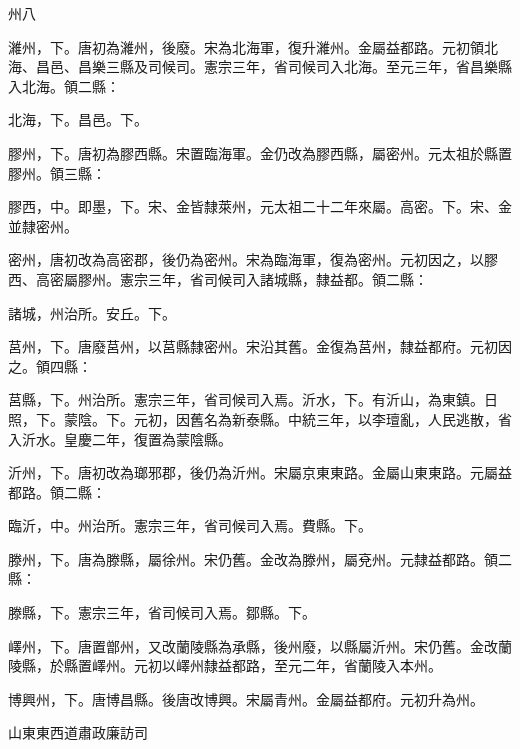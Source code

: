 \begin{pinyinscope}
 州八



 濰州，下。唐初為濰州，後廢。宋為北海軍，復升濰州。金屬益都路。元初領北海、昌邑、昌樂三縣及司候司。憲宗三年，省司候司入北海。至元三年，省昌樂縣入北海。領二縣：



 北海，下。昌邑。下。



 膠州，下。唐初為膠西縣。宋置臨海軍。金仍改為膠西縣，屬密州。元太祖於縣置膠州。領三縣：



 膠西，中。即墨，下。宋、金皆隸萊州，元太祖二十二年來屬。高密。下。宋、金並隸密州。



 密州，唐初改為高密郡，後仍為密州。宋為臨海軍，復為密州。元初因之，以膠西、高密屬膠州。憲宗三年，省司候司入諸城縣，隸益都。領二縣：



 諸城，州治所。安丘。下。



 莒州，下。唐廢莒州，以莒縣隸密州。宋沿其舊。金復為莒州，隸益都府。元初因之。領四縣：



 莒縣，下。州治所。憲宗三年，省司候司入焉。沂水，下。有沂山，為東鎮。日照，下。蒙陰。下。元初，因舊名為新泰縣。中統三年，以李璮亂，人民逃散，省入沂水。皇慶二年，復置為蒙陰縣。



 沂州，下。唐初改為瑯邪郡，後仍為沂州。宋屬京東東路。金屬山東東路。元屬益都路。領二縣：



 臨沂，中。州治所。憲宗三年，省司候司入焉。費縣。下。



 滕州，下。唐為滕縣，屬徐州。宋仍舊。金改為滕州，屬兗州。元隸益都路。領二縣：



 滕縣，下。憲宗三年，省司候司入焉。鄒縣。下。



 嶧州，下。唐置鄫州，又改蘭陵縣為承縣，後州廢，以縣屬沂州。宋仍舊。金改蘭陵縣，於縣置嶧州。元初以嶧州隸益都路，至元二年，省蘭陵入本州。



 博興州，下。唐博昌縣。後唐改博興。宋屬青州。金屬益都府。元初升為州。



 山東東西道肅政廉訪司




\end{pinyinscope}
